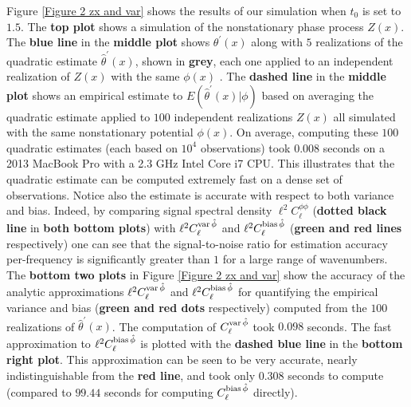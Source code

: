 \documentclass[10pt,noinfoline]{imsart}
\begin{document}
Figure \ref{Figure 2 zx and var} shows the results of our simulation when $t_0$ is set to $1.5$. The \textbf{top plot} shows a simulation of the nonstationary phase process $Z(x)$. The \textbf{blue line} in the \textbf{middle plot} shows $\theta^\prime(x)$ along with $5$ realizations of the quadratic estimate $\hat\theta^\prime(x)$, shown in \textbf{grey}, each one applied to an independent realization of $Z(x)$ with the same $\phi(x)$ . The \textbf{dashed line} in the \textbf{middle plot} shows an empirical estimate to $E(\hat\theta^\prime(x)|\phi)$ based on averaging the quadratic estimate applied to $100$ independent realizations $Z(x)$ all simulated with the same nonstationary potential $\phi(x)$. On average, computing these $100$ quadratic estimates (each based on $10^4$ observations) took $0.008$ seconds on a 2013 MacBook Pro with a 2.3 GHz Intel Core i7 CPU. This illustrates that the quadratic estimate can be computed extremely fast on a dense set of observations. Notice also the estimate is accurate with respect to both variance and bias. Indeed, by comparing signal spectral density $\ell^2 C_\ell^{\phi\phi}$ (\textbf{dotted black line} in \textbf{both bottom plots})  with  $\ell^2 C^{\text{var\,}\hat\phi}_{\ell}$ and $\ell^2 C^{\text{bias\,}\hat\phi}_{\ell}$  (\textbf{green and red lines} respectively) one can see that the signal-to-noise ratio for estimation accuracy per-frequency is significantly greater than $1$ for a large range of wavenumbers. The \textbf{bottom two plots} in Figure \ref{Figure 2 zx and var} show the accuracy of the analytic approximations $\ell^2 C^{\text{var\,}\hat\phi}_{\ell}$ and  $\ell^2 C^{\text{bias\,}\hat\phi}_{\ell}$ for quantifying the empirical variance and bias (\textbf{green and red dots} respectively) computed from the $100$ realizations of $\hat\theta^\prime(x)$. The computation of $C^{\text{var\,}\hat\phi}_{\ell}$ took $0.098$ seconds. The fast approximation to  $\ell^2 C^{\text{bias\,}\hat\phi}_{\ell}$ is plotted with the \textbf{dashed blue line} in the \textbf{bottom right plot}. This approximation can be seen to be very accurate, nearly indistinguishable from the \textbf{red line}, and took only $0.308$ seconds to compute (compared to $99.44$ seconds for computing  $C^{\text{bias\,}\hat\phi}_{\ell}$ directly).
\end{document}
